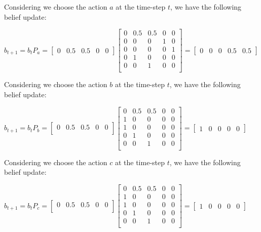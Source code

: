 \documentclass{article}
\begin{document}
\bigskip

Considering we choose the action $a$ at the time-step $t$, we have the following belief update:

\medskip

$
  \hat{b}_{t+1} = b_t P_a = 
  \begin{bmatrix}
    0 & 0.5 & 0.5 & 0 & 0
  \end{bmatrix}
  \begin{bmatrix}
    0 & 0.5 & 0.5 & 0 & 0 \\
    0 & 0 & 0 & 1 & 0 \\
    0 & 0 & 0 & 0 & 1 \\
    0 & 1 & 0 & 0 & 0 \\
    0 & 0 & 1 & 0 & 0 \\
  \end{bmatrix} = \begin{bmatrix}
    0 & 0 & 0 & 0.5 & 0.5
  \end{bmatrix}
$

\bigskip

Considering we choose the action $b$ at the time-step $t$, we have the following belief update:

\medskip

$
  \hat{b}_{t+1} = b_t P_b = 
  \begin{bmatrix}
    0 & 0.5 & 0.5 & 0 & 0 \\
  \end{bmatrix}
  \begin{bmatrix}
    0 & 0.5 & 0.5 & 0 & 0 \\
    1 & 0 & 0 & 0 & 0 \\
    1 & 0 & 0 & 0 & 0 \\
    0 & 1 & 0 & 0 & 0 \\
    0 & 0 & 1 & 0 & 0 \\
  \end{bmatrix} = \begin{bmatrix}
    1 & 0 & 0 & 0 & 0
  \end{bmatrix}
$

\bigskip

Considering we choose the action $c$ at the time-step $t$, we have the following belief update:

\medskip

$
  \hat{b}_{t+1} = b_t P_c = 
  \begin{bmatrix}
    0 & 0.5 & 0.5 & 0 & 0 \\
  \end{bmatrix}
  \begin{bmatrix}
    0 & 0.5 & 0.5 & 0 & 0 \\
    1 & 0 & 0 & 0 & 0 \\
    1 & 0 & 0 & 0 & 0 \\
    0 & 1 & 0 & 0 & 0 \\
    0 & 0 & 1 & 0 & 0 \\
  \end{bmatrix}
  = \begin{bmatrix}
    1 & 0 & 0 & 0 & 0
  \end{bmatrix}
$
\end{document}
